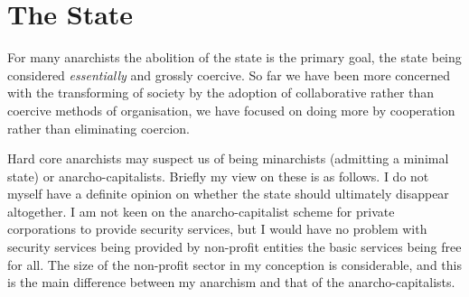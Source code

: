 \section{The State}\label{State}

For many anarchists the abolition of the state is the primary goal, the state being considered {\it essentially} and grossly coercive.
So far we have been more concerned with the transforming of society by the adoption of collaborative rather than coercive methods of organisation, we have focused on doing more by cooperation rather than eliminating coercion.

Hard core anarchists may suspect us of being minarchists (admitting a minimal state) or anarcho-capitalists.
Briefly my view on these is as follows.
I do not myself have a definite opinion on whether the state should ultimately disappear altogether.
I am not keen on the anarcho-capitalist scheme for private corporations to provide security services, but I would have no problem with security services being provided by non-profit entities the basic services being free for all.
The size of the non-profit sector in my conception is considerable, and this is the main difference between my anarchism and that of the anarcho-capitalists.



